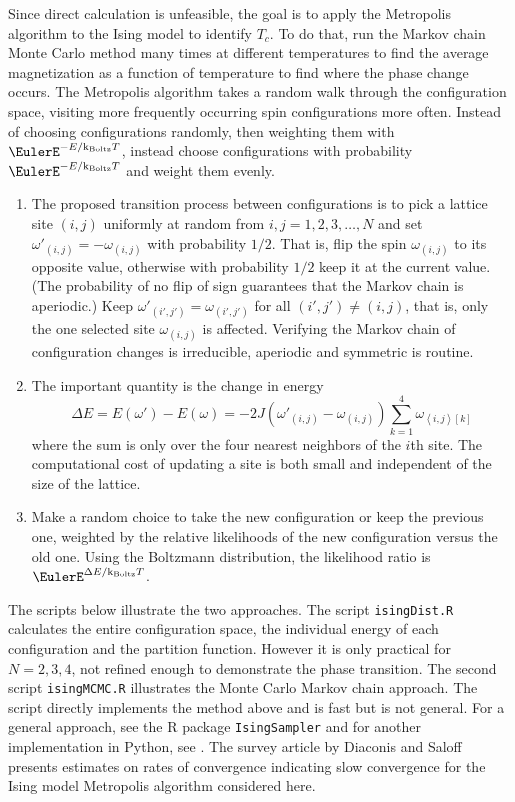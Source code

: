 \documentclass[12pt]{article}
\newcommand{\kT}{{\text k}_{\text{Boltz}}T}
\begin{document}
Since direct calculation is unfeasible, the goal is to apply the
Metropolis algorithm to the Ising model to identify \( T_c \).  To do
that, run the Markov chain Monte Carlo method many times at different
temperatures to find the average magnetization as a function of
temperature to find where the phase change occurs.  The Metropolis
algorithm takes a random walk through the configuration space, visiting
more frequently occurring spin configurations more often.  Instead of
choosing configurations randomly, then weighting them with \( \EulerE^{-E/\kT}
\), instead choose configurations with probability \( \EulerE^{-E/\kT} \)
and weight them evenly.
\begin{enumerate}
    \item
        The proposed transition process between configurations is to
        pick a lattice site \( (i, j) \) uniformly at random from \( i,
        j = 1, 2, 3, \dots, N \) and set \( \omega'_{(i,j)} = -\omega_{(i,j)}
        \) with probability \( 1/2 \).  That is, flip the spin \( \omega_
        {(i,j)} \) to its opposite value, otherwise with probability \(
        1/2 \) keep it at the current value.  (The probability of no
        flip of sign guarantees that the Markov chain is aperiodic.)
        Keep \( \omega'_{(i', j')}
        = \omega_{(i',j')} \) for all \( (i', j') \ne (i, j) \), that
        is, only the one selected site \( \omega_{(i,j)} \) is affected.
        Verifying the Markov chain of configuration changes is
        irreducible, aperiodic and symmetric is routine.
    \item
        The important quantity is the change in energy
        \[
            \Delta E = E(\omega') - E(\omega) = -2J (\omega'_{(i,j)} -
            \omega_{(i,j)}) \sum\limits_{k=1}^4\omega_{\left\langle i,j
            \right\rangle[k]}
        \] where the sum is only over the four nearest neighbors of the \(
        i \)th site.  The computational cost of updating a site is both
        small and independent of the size of the lattice.
    \item
        Make a random choice to take the new configuration or keep the
        previous one, weighted by the relative likelihoods of the new
        configuration versus the old one.  Using the Boltzmann
        distribution, the likelihood ratio is \( \EulerE^{\Delta E/\kT} \).
\end{enumerate}

The scripts below illustrate the two approaches.  The script \texttt
{isingDist.R} calculates the entire configuration space, the individual
energy of each configuration and the partition function. However it is
only practical for \( N = 2, 3, 4 \), not refined enough to demonstrate
the phase transition.  The second script \texttt{isingMCMC.R}
illustrates the Monte Carlo Markov chain approach.  The script directly
implements the method above and is fast but is not general.  For a
general approach, see the R package \texttt{IsingSampler}
\cite{epskamp20} and for another implementation in Python, see
\cite{schlusser18}.  The survey article by Diaconis and Saloff
\cite{DIACONIS199820} presents estimates on rates of convergence
indicating slow convergence for the Ising model Metropolis algorithm
considered here.
\end{document}
